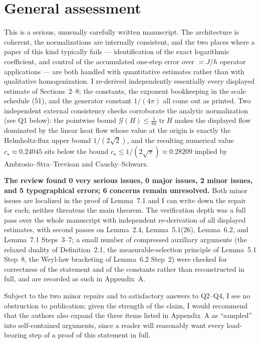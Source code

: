 \documentclass[11pt]{article}
\begin{document}
\section*{General assessment}

This is a serious, unusually carefully written manuscript. The architecture is coherent, the
normalizations are internally consistent, and the two places where a paper of this kind
typically fails --- identification of the exact logarithmic coefficient, and control of the
accumulated one-step error over $\asymp J/h$ operator applications --- are both handled with
quantitative estimates rather than with qualitative homogenization. I re-derived independently
essentially every displayed estimate of Sections~2--8; the constants, the exponent bookkeeping
in the scale schedule (51), and the generator constant $1/(4\pi)$ all come out as
printed. Two independent external consistency checks corroborate the analytic normalization
(see Q1 below): the pointwise bound $\mathcal G(H)\le\frac1{8\pi}\operatorname{tr}H$ makes the
displayed flow dominated by the linear heat flow whose value at the origin is exactly the
Helmholtz-flux upper bound $1/(2\sqrt2)$, and the resulting numerical value
$c_\star\approx0.24045$ sits below the bound $c_\star\le 1/(2\sqrt\pi)\approx0.28209$ implied by
Ambrosio--Stra--Trevisan and Cauchy--Schwarz.

\textbf{The review found 0 very serious issues, 0 major issues, 2 minor issues, and 5
typographical errors; 6 concerns remain unresolved.} Both minor issues are localized in the
proof of Lemma~7.1 and I can write down the repair for each; neither threatens the main theorem.
The verification depth was a full pass over the whole manuscript with independent re-derivation
of all displayed estimates, with second passes on Lemma~2.4, Lemma~5.1(26), Lemma~6.2, and
Lemma~7.1 Steps~3--7; a small number of compressed auxiliary arguments (the relaxed duality of
Definition~2.1, the measurable-selection principle of Lemma~5.1 Step~8, the Weyl-law bracketing
of Lemma~6.2 Step~2) were checked for correctness of the statement and of the constants rather
than reconstructed in full, and are recorded as such in Appendix~A.

Subject to the two minor repairs and to satisfactory answers to Q2--Q4, I see no obstruction to
publication; given the strength of the claim, I would recommend that the authors also expand
the three items listed in Appendix~A as ``sampled'' into self-contained arguments, since a
reader will reasonably want every load-bearing step of a proof of this statement in full.
\end{document}
